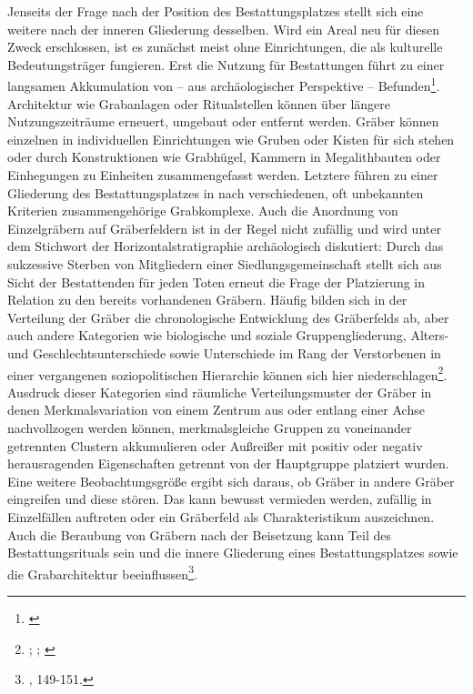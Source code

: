 \documentclass[openany,twoside,twocolumn]{book}
\let\rmarkdownfootnote\footnote%
\def\footnote{\protect\rmarkdownfootnote}
\begin{document}
Jenseits der Frage nach der Position des Bestattungsplatzes stellt sich
eine weitere nach der inneren Gliederung desselben. Wird ein Areal neu
für diesen Zweck erschlossen, ist es zunächst meist ohne Einrichtungen,
die als kulturelle Bedeutungsträger fungieren. Erst die Nutzung für
Bestattungen führt zu einer langsamen Akkumulation von -- aus
archäologischer Perspektive -- Befunden\footnote{\textcite{koch_geschichte_1989}}.
Architektur wie Grabanlagen oder Ritualstellen können über längere
Nutzungszeiträume erneuert, umgebaut oder entfernt werden. Gräber können
einzelnen in individuellen Einrichtungen wie Gruben oder Kisten für sich
stehen oder durch Konstruktionen wie Grabhügel, Kammern in
Megalithbauten oder Einhegungen zu Einheiten zusammengefasst werden.
Letztere führen zu einer Gliederung des Bestattungsplatzes in nach
verschiedenen, oft unbekannten Kriterien zusammengehörige Grabkomplexe.
Auch die Anordnung von Einzelgräbern auf Gräberfeldern ist in der Regel
nicht zufällig und wird unter dem Stichwort der Horizontalstratigraphie
archäologisch diskutiert: Durch das sukzessive Sterben von Mitgliedern
einer Siedlungsgemeinschaft stellt sich aus Sicht der Bestattenden für
jeden Toten erneut die Frage der Platzierung in Relation zu den bereits
vorhandenen Gräbern. Häufig bilden sich in der Verteilung der Gräber die
chronologische Entwicklung des Gräberfelds ab, aber auch andere
Kategorien wie biologische und soziale Gruppengliederung, Alters- und
Geschlechtsunterschiede sowie Unterschiede im Rang der Verstorbenen in
einer vergangenen soziopolitischen Hierarchie können sich hier
niederschlagen\footnote{\textcite{derks_geschlechtsspezifische_1993};
  \textcite{mchugh_theoretical_1999}; \textcite{veit_tod_1997}}.
Ausdruck dieser Kategorien sind räumliche Verteilungsmuster der Gräber
in denen Merkmalsvariation von einem Zentrum aus oder entlang einer
Achse nachvollzogen werden können, merkmalsgleiche Gruppen zu
voneinander getrennten Clustern akkumulieren oder Außreißer mit positiv
oder negativ herausragenden Eigenschaften getrennt von der Hauptgruppe
platziert wurden. Eine weitere Beobachtungsgröße ergibt sich daraus, ob
Gräber in andere Gräber eingreifen und diese stören. Das kann bewusst
vermieden werden, zufällig in Einzelfällen auftreten oder ein Gräberfeld
als Charakteristikum auszeichnen. Auch die Beraubung von Gräbern nach
der Beisetzung kann Teil des Bestattungsrituals sein und die innere
Gliederung eines Bestattungsplatzes sowie die Grabarchitektur
beeinflussen\footnote{\textcite{hofmann_rituelle_2008}, 149-151.}.
\end{document}

